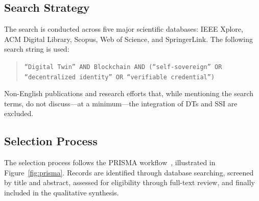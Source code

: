 \subsection{Search Strategy}
\label{subsec:search-strategy}

The search is conducted across five major scientific databases: IEEE Xplore, ACM Digital Library, Scopus, Web of Science, and SpringerLink.
The following search string is used:

\begin{quote}
    \texttt{``Digital Twin'' AND Blockchain AND (``self-sovereign'' OR ``decentralized identity'' OR ``verifiable credential'')}
\end{quote}

Non-English publications and research efforts that, while mentioning the search terms, do not discuss---at a minimum---the integration of \acp{DT} and \ac{SSI} are excluded.

\subsection{Selection Process}
\label{subsec:prisma}

The selection process follows the PRISMA workflow~\cite{moher:liberati:tetzlaff:etal:2010}, illustrated in Figure~\ref{fig:prisma}.
Records are identified through database searching, screened by title and abstract, assessed for eligibility through full-text review, and finally included in the qualitative synthesis.

